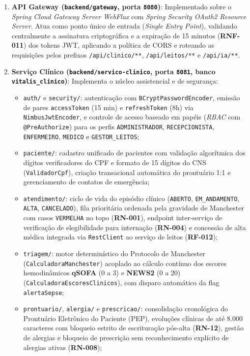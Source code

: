 \begin{enumerate}[leftmargin=*]
    \item \textbf{API Gateway (\texttt{backend/gateway}, porta \texttt{8080})}:
    Implementado sobre o \textit{Spring Cloud Gateway Server WebFlux} com \textit{Spring Security OAuth2 Resource Server}. Atua como ponto único de entrada (\textit{Single Entry Point}), validando centralmente a assinatura criptográfica e a expiração de 15 minutos (\textbf{RNF-011}) dos tokens JWT, aplicando a política de CORS e roteando as requisições pelos prefixos \texttt{/api/clinico/**}, \texttt{/api/leitos/**} e \texttt{/api/ia/**}.

    \item \textbf{Serviço Clínico (\texttt{backend/servico-clinico}, porta \texttt{8081}, banco \texttt{vitalis\_clinico})}:
    Implementa o núcleo assistencial e de segurança:
    \begin{itemize}[noitemsep]
        \item \texttt{auth/} e \texttt{security/}: autenticação com \texttt{BCryptPasswordEncoder}, emissão de pares \texttt{accessToken} (15 min) e \texttt{refreshToken} (8h) via \texttt{NimbusJwtEncoder}, e controle de acesso baseado em papéis (\textit{RBAC} com \texttt{@PreAuthorize}) para os perfis \texttt{ADMINISTRADOR}, \texttt{RECEPCIONISTA}, \texttt{ENFERMEIRO}, \texttt{MEDICO} e \texttt{GESTOR\_LEITOS};
        \item \texttt{paciente/}: cadastro unificado de pacientes com validação algorítmica dos dígitos verificadores do CPF e formato de 15 dígitos do CNS (\texttt{ValidadorCpf}), criação transacional automática do prontuário 1:1 e gerenciamento de contatos de emergência;
        \item \texttt{atendimento/}: ciclo de vida do episódio clínico (\texttt{ABERTO}, \texttt{EM\_ANDAMENTO}, \texttt{ALTA}, \texttt{CANCELADO}), fila prioritária ordenada pela gravidade de Manchester com casos \texttt{VERMELHA} no topo (\textbf{RN-001}), endpoint inter-serviço de verificação de elegibilidade para internação (\textbf{RN-004}) e concessão de alta médica integrada via \texttt{RestClient} ao serviço de leitos (\textbf{RF-012});
        \item \texttt{triagem/}: motor determinístico do Protocolo de Manchester (\texttt{CalculadoraManchester}) acoplado ao cálculo contínuo dos escores hemodinâmicos \textbf{qSOFA} (0 a 3) e \textbf{NEWS2} (0 a 20) (\texttt{CalculadoraEscoresClinicos}), com disparo automático da flag \texttt{alertaSepse};
        \item \texttt{prontuario/}, \texttt{alergia/} e \texttt{prescricao/}: consolidação cronológica do Prontuário Eletrônico do Paciente (PEP), evoluções clínicas de até 8.000 caracteres com bloqueio estrito de escrituração pós-alta (\textbf{RN-12}), gestão de alergias e bloqueio de prescrição sem reconhecimento explícito de alergias ativas (\textbf{RN-008});

\end{itemize}
\end{enumerate}
